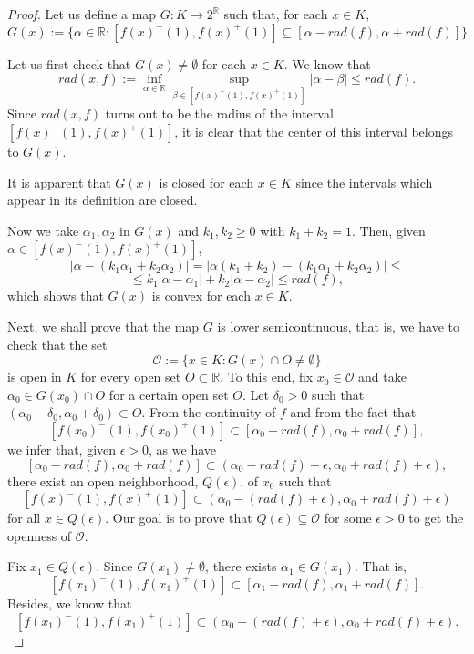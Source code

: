 \documentclass[12pt]{amsart}
\begin{document}
\begin{proof}
Let us define a map $G:K\longrightarrow 2^{\mathbb{R}}$ such that, for each $x\in K$,
\[G(x):=\{\alpha\in \mathbb{R}:[f(x)^-(1),f(x)^+(1)]\subseteq [\alpha-rad(f),\alpha+rad(f)]\}\]

Let us first check that $G(x)\neq \emptyset$ for each $x\in K$. We know that
\[
rad(x,f):=\inf_{\alpha\in \mathbb{R}}\sup_{\beta\in [f(x)^-(1),f(x)^+(1)]}|\alpha-\beta|\le rad(f).
\]
Since $rad(x,f)$ turns out to be the radius of the interval $[f(x)^-(1),f(x)^+(1)]$, it is clear that the center of this interval belongs to $G(x)$.

\medskip
It is apparent that $G(x)$ is closed  for each $x\in K$ since the intervals which appear in its definition are closed.

\medskip
Now we take $\alpha_1,\alpha_2$ in $G(x)$ and $k_1,k_2\ge 0$ with $k_1+k_2=1$. Then, given $\alpha\in [f(x)^-(1),f(x)^+(1)]$,
\[|\alpha-(k_1\alpha_1+k_2\alpha_2)|=|\alpha(k_1+k_2)-(k_1\alpha_1+k_2\alpha_2)|\le\]
\[\le k_1|\alpha-\alpha_1|+k_2|\alpha-\alpha_2|\le rad(f),\]
which shows that $G(x)$ is convex for each $x\in K$.


%
\medskip
Next, we shall prove that the map $G$ is lower semicontinuous, that is, we have to check that the set
\[\mathcal{O}:=\{x\in K: G(x)\cap O\neq \emptyset\}\]
is open in $K$ for every open set $O\subset \mathbb{R}$. To this end, fix $x_0\in \mathcal{O}$ and take $\alpha_0\in G(x_0)\cap O$ for a certain open set $O$.
Let $\delta_0>0$ such that $(\alpha_0-\delta_0,\alpha_0+\delta_0)\subset O$.
From the continuity of $f$ and from the fact that
\[
[f(x_0)^-(1),f(x_0)^+(1)]\subset [\alpha_0-rad(f),\alpha_0+rad(f)],
\]
 we infer that, given $\epsilon>0$, as we have
 \[
[\alpha_0-rad(f),\alpha_0+rad(f)]\subset (\alpha_0-rad(f)-\epsilon,\alpha_0+rad(f)+\epsilon),
 \]
there exist an open neighborhood, $Q(\epsilon)$, of $x_0$ such that
\[
[f(x)^-(1),f(x)^+(1)]\subset (\alpha_0-(rad(f)+\epsilon),\alpha_0+rad(f)+\epsilon)
\]
for all $x\in Q(\epsilon)$. Our goal is to prove that $Q(\epsilon)\subseteq \mathcal{O}$ for some $\epsilon>0$ to get the openness of $\mathcal{O}$.

Fix $x_1\in Q(\epsilon)$. Since $G(x_1)\neq \emptyset$, there exists $\alpha_1\in G(x_1)$. That is,
\[
[f(x_1)^-(1),f(x_1)^+(1)]\subset [\alpha_1-rad(f),\alpha_1+rad(f)].
\]
Besides, we know that
\[
[f(x_1)^-(1),f(x_1)^+(1)]\subset (\alpha_0-(rad(f)+\epsilon),\alpha_0+rad(f)+\epsilon).
\]




\end{proof}
\end{document}

